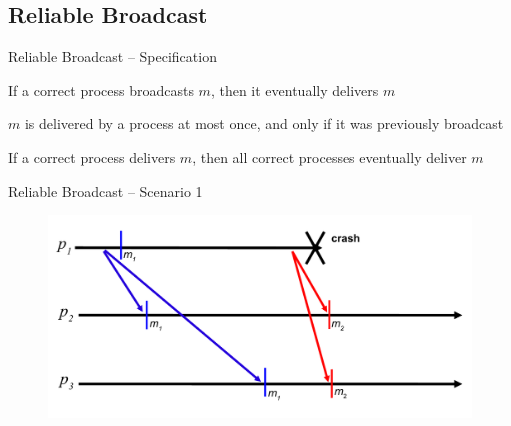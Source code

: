 \subsection{Reliable Broadcast}

\begin{frame}{Reliable Broadcast -- Specification}

\begin{definition}[RB1 -- Validity]
If a correct process broadcasts $m$, then it eventually delivers $m$
\end{definition}

\begin{definition}
$m$ is delivered by a process at most once, and only if 
it was previously broadcast
\end{definition}

\begin{definition}[RB3 -- Agreement]
If a correct process delivers $m$, then all correct processes eventually deliver $m$
\end{definition}



\end{frame}

\begin{frame}{Reliable Broadcast -- Scenario 1}


\begin{figure}
\includegraphics[width=\textwidth]{figs/04/rb-scenario1}
\end{figure}



\end{frame}

